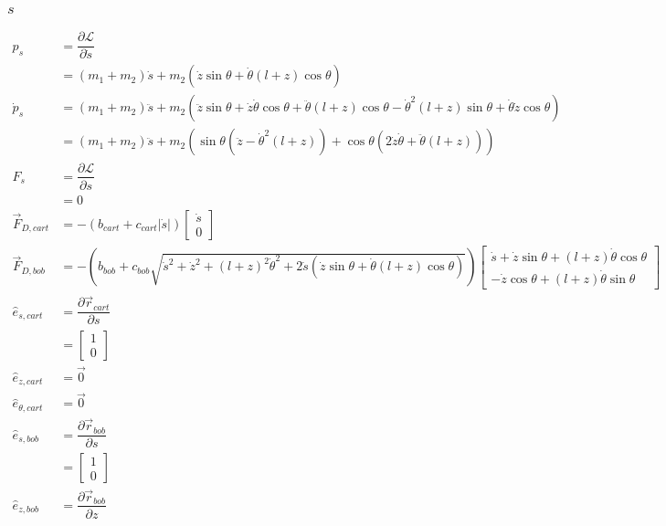 \documentclass[12pt,a4paper,portrait]{article}
\newcommand{\lag}{\mathcal{L}}
\begin{document}
\subsubsection{$s$}
\begin{align*}
	p_s &= \dfrac{\partial \lag}{\partial \dot{s}} \\
	&= (m_1+m_2)\dot{s} + m_2(\dot{z}\sin{\theta} + \dot{\theta}(l+z)\cos{\theta}) \\
	\dot{p}_s &= (m_1+m_2)\ddot{s} + m_2(\ddot{z}\sin{\theta}+\dot{z}\dot{\theta}\cos{\theta}+\ddot{\theta}(l+z)\cos{\theta}-\dot{\theta}^2(l+z)\sin{\theta}+\dot{\theta}\dot{z}\cos{\theta}) \\
	&= (m_1+m_2)\ddot{s} + m_2(\sin{\theta}(\ddot{z}-\dot{\theta}^2(l+z))+\cos{\theta}(2\dot{z}\dot{\theta}+\ddot{\theta}(l+z)))\\
	F_{s} &= \dfrac{\partial \lag}{\partial s} \\
	&= 0 \\
	\vec{F}_{D,cart} &= -(b_{cart}+c_{cart}|\dot{s}|)\begin{bmatrix}
		\dot{s}\\
		0
	\end{bmatrix} \\
	\vec{F}_{D,bob} &= -(b_{bob}+c_{bob}\sqrt{\dot{s}^2 + \dot{z}^2 + (l+z)^2\dot{\theta}^2 + 2\dot{s}(\dot{z}\sin{\theta} + \dot{\theta}(l+z)\cos{\theta})})\begin{bmatrix}
		\dot{s} + \dot{z}\sin{\theta} + (l+z)\dot{\theta}\cos{\theta} \\
		-\dot{z}\cos{\theta} + (l+z)\dot{\theta}\sin{\theta}
	\end{bmatrix} \\
	\hat{e}_{s, cart} &= \dfrac{\partial \vec{r}_{cart}}{\partial s} \\
	&= \begin{bmatrix}
		1 \\
		0
	\end{bmatrix} \\
	\hat{e}_{z, cart} &= \vec{0} \\
	\hat{e}_{\theta, cart} &= \vec{0} \\
	\hat{e}_{s, bob} &= \dfrac{\partial \vec{r}_{bob}}{\partial s} \\
	&= \begin{bmatrix}
		1 \\
		0
	\end{bmatrix} \\
	\hat{e}_{z, bob} &= \dfrac{\partial \vec{r}_{bob}}{\partial z} \\

\end{align*}
\end{document}
